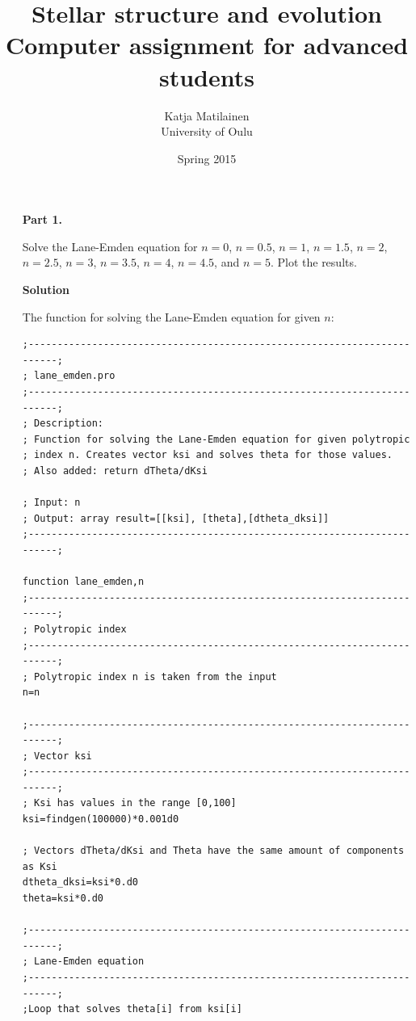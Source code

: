 \documentclass[a4paper,12pt]{article}
\author{Katja Matilainen \\ University of Oulu}
\title{Stellar structure and evolution \\ Computer assignment for advanced students}
\date{Spring 2015}
\begin{document}
\begin{tiny}
\maketitle
\end{tiny}

\vspace{0.5cm}
\begin{itemize}

\item[\textbf{Part 1.}]

Solve the Lane-Emden equation for $n=0$, $n=0.5$, $n=1$, $n=1.5$, $n=2$, $n=2.5$, $n=3$, $n=3.5$, $n=4$, $n=4.5$, and $n=5$. Plot the results.

\vspace{0.5cm}
\textbf{Solution}

The function for solving the Lane-Emden equation for given $n$:

\begin{scriptsize}
\begin{verbatim}
;------------------------------------------------------------------------;
; lane_emden.pro
;------------------------------------------------------------------------;
; Description:
; Function for solving the Lane-Emden equation for given polytropic
; index n. Creates vector ksi and solves theta for those values.
; Also added: return dTheta/dKsi

; Input: n
; Output: array result=[[ksi], [theta],[dtheta_dksi]]
;------------------------------------------------------------------------;

function lane_emden,n
;------------------------------------------------------------------------;
; Polytropic index
;------------------------------------------------------------------------;
; Polytropic index n is taken from the input
n=n

;------------------------------------------------------------------------;
; Vector ksi
;------------------------------------------------------------------------;
; Ksi has values in the range [0,100]
ksi=findgen(100000)*0.001d0

; Vectors dTheta/dKsi and Theta have the same amount of components as Ksi
dtheta_dksi=ksi*0.d0
theta=ksi*0.d0

;------------------------------------------------------------------------;
; Lane-Emden equation
;------------------------------------------------------------------------;
;Loop that solves theta[i] from ksi[i]


\end{verbatim}
\end{scriptsize}
\end{itemize}
\end{document}
